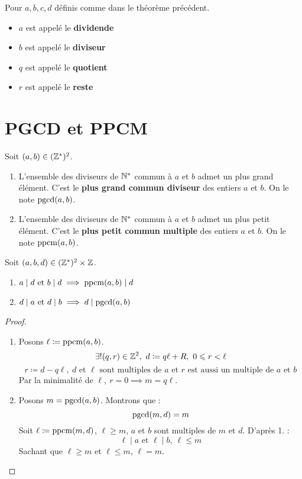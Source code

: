 \begin{nomenclature}
    Pour $a, b, c, d$ définis comme dans le théorème précédent.
    \begin{multicols}{2}
        \begin{itemize}
        \item $a$ est appelé le \textbf{dividende}
        \item $b$ est appelé le \textbf{diviseur}
        \item $q$ est appelé le \textbf{quotient}
        \item $r$ est appelé le \textbf{reste}
    \end{itemize}
    \end{multicols}
\end{nomenclature}

\section{PGCD et PPCM}

\begin{definition}
	Soit $(a, b) \in (\mathbb{Z}^*)^2$. 
	\begin{enumerate}
		\item L'ensemble des diviseurs de $\mathbb{N}^*$ commun à $a$ et $b$ admet un plus grand élément. C'est le \textbf{plus grand commun diviseur} des entiers $a$ et $b$. On le note $\operatorname{pgcd}(a,b)$.
		\item L'ensemble des diviseurs de $\mathbb{N}^*$ commun à $a$ et $b$ admet un plus petit élément. C'est le \textbf{plus petit commun multiple} des entiers $a$ et $b$. On le note $\operatorname{ppcm}(a, b)$.
	\end{enumerate}
\end{definition}

\begin{theorem}
	Soit $(a, b, d) \in (\mathbb{Z}^*)^2 \times \mathbb{Z}$.
	\begin{enumerate}
		\item $a \mid d \text{ et } b \mid d \implies \operatorname{ppcm}(a, b) \mid d$
		\item $d \mid a \text{ et } d \mid b \implies d \mid \operatorname{pgcd}(a, b)$
	\end{enumerate}
\end{theorem}

\begin{proof}
	\leavevmode
	\begin{enumerate}
		\item Posons $\ell \coloneqq \operatorname{ppcm}(a,b)$. 
		\[ \exists ! (q,r) \in \mathbb{Z}^2,\ d \coloneqq q \ell + R,\ 0 \leqslant r < \ell \]
		\[ r \coloneqq d - q \ell,\ d \text{ et } \ell \text{ sont multiples de } a \text{ et } r \text{ est aussi un multiple de } a \text{ et } b \]
		Par la minimalité de $\ell,\ r = 0 \implies m = q \ell$.
		\item Posons $m = \operatorname{pgcd}(a, b)$. Montrons que :
		\[ \operatorname{pgcd}(m, d) = m \]
		Soit $\ell \coloneqq \operatorname{ppcm}(m,d)$, $\ell \geq m$, $a$ et $b$ sont multiples de $m$ et $d$. D'après 1. :
		\[ \ell \mid a \text{ et } \ell \mid b,\ \ell \leq m \]
		Sachant que $\ell \geq m$ et $\ell \leq m$, $\ell = m$.
	\end{enumerate}
\end{proof}

